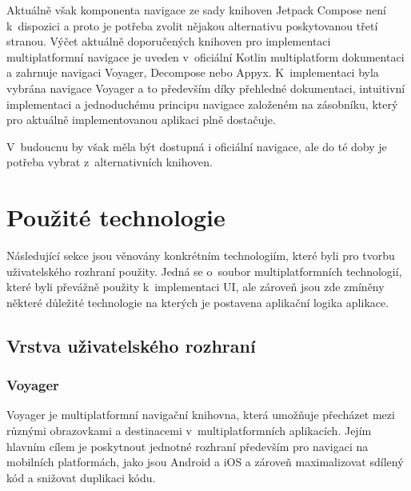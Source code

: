 Aktuálně však komponenta navigace ze sady knihoven Jetpack Compose není k~dispozici a proto je potřeba zvolit nějakou alternativu poskytovanou
třetí stranou. \cite{composeNav} Výčet aktuálně doporučených knihoven pro implementaci multiplatformní navigace je uveden v~oficiální Kotlin 
multiplatform dokumentaci a zahrnuje navigaci Voyager, Decompose nebo Appyx. K~implementaci byla vybrána navigace Voyager a 
to především díky přehledné dokumentaci, intuitivní implementaci a jednoduchému principu navigace založeném na zásobníku, který pro aktuálně
implementovanou aplikaci plně dostačuje.

V~budoucnu by však měla být dostupná i oficiální navigace, ale do té doby je potřeba vybrat z~alternativních knihoven.

\section{Použité technologie}
Následující sekce jsou věnovány konkrétním technologiím, které byli pro tvorbu uživatelského rozhraní použity.
Jedná se o~soubor multiplatformních technologií, které byli převážně použity k~implementaci UI, ale zároveň jsou zde zmíněny některé 
důležité technologie na kterých je postavena aplikační logika aplikace.

\subsection{Vrstva uživatelského rozhraní}

\subsubsection*{Voyager}
Voyager je multiplatformní navigační knihovna, která umožňuje přecházet mezi různými obrazovkami a destinacemi v~multiplatformních
aplikacích. \cite{voyager} Jejím hlavním cílem je poskytnout jednotné rozhraní především pro navigaci na mobilních platformách, jako 
jsou Android a iOS a zároveň maximalizovat sdílený kód a snižovat duplikaci kódu.

\medskip

